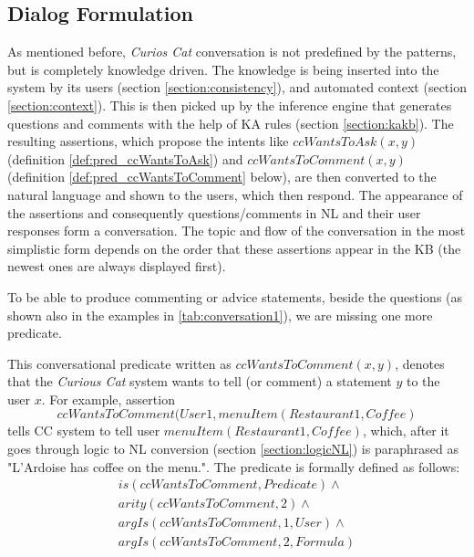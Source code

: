 \subsection{Dialog Formulation}
\label{section:dialog}
As mentioned before, \emph{Curios Cat} conversation is not predefined by the 
patterns, but is completely knowledge driven. The knowledge is being inserted
into the system by its users (section \ref{section:consistency}), and automated
context (section \ref{section:context}). This is then picked up by the 
inference engine that generates questions and comments with the help of KA rules
(section \ref{section:kakb}). The resulting assertions, which propose the 
intents like $ccWantsToAsk(x,y)$ (definition \ref{def:pred_ccWantsToAsk}) and
$ccWantsToComment(x,y)$ (definition \ref{def:pred_ccWantsToComment} below), 
are then converted to the natural language and shown to the users, which then 
respond. The appearance of the assertions and consequently questions/comments
in NL and their user responses form a conversation. The topic and flow of the 
conversation in the most simplistic form depends on the order that these
assertions appear in the KB (the newest ones are always displayed first).

To be able to produce commenting or advice statements, beside the questions
(as shown also in the examples in \autoref{tab:conversation1}), we are missing
one more predicate.

\begin{definition}
\label{def:pred_ccWantsToComment}
This conversational predicate written as $ccWantsToComment(x,y)$, denotes that 
the \emph{Curious Cat} system wants to tell (or comment) a statement $y$ to
the user $x$. For example, assertion 
\begin{equation*}
ccWantsToComment(User1, menuItem(Restaurant1,Coffee)
\end{equation*}
tells CC system to tell user $menuItem(Restaurant1,Coffee)$, which,
after it goes through logic to NL conversion (section \ref{section:logicNL}) 
is paraphrased as "L'Ardoise has coffee on the menu.". The predicate is 
formally defined as follows:
\begin{equation}\label{as:ccWantsToComment}
\begin{gathered}
	is(ccWantsToComment,Predicate) \land \\
	arity(ccWantsToComment,2) \land\\ 
	argIs(ccWantsToComment,1,User) \land \\
	argIs(ccWantsToComment,2,Formula)
\end{gathered}
\end{equation}
\end{definition}

